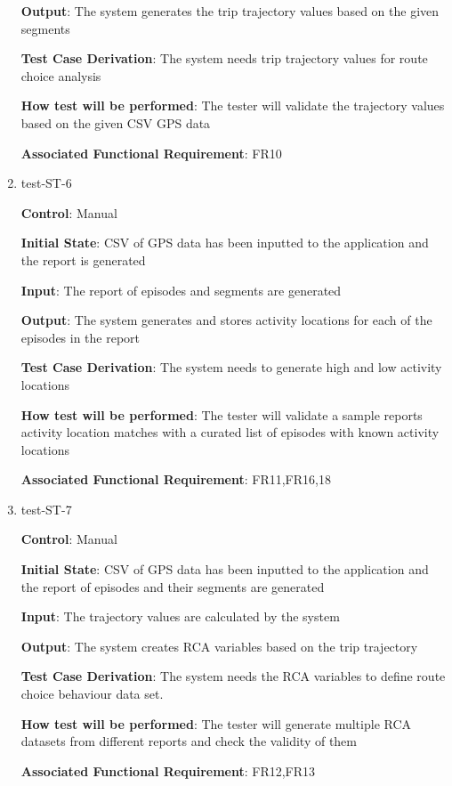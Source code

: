 \documentclass[12pt, titlepage]{article}
\begin{document}
\begin{enumerate}
\textbf{Output}: The system generates the trip trajectory values based on the given segments

\textbf{Test Case Derivation}: The system needs trip trajectory values for route choice analysis

\textbf{How test will be performed}: The tester will validate the trajectory values based on the given CSV GPS data 

\textbf{Associated Functional Requirement}: FR10

\item{test-ST-6\\}

\textbf{Control}: Manual
					
\textbf{Initial State}: CSV of GPS data has been inputted to the application and the report is generated
					
\textbf{Input}: The report of episodes and segments are generated
					
\textbf{Output}: The system generates and stores activity locations for each of the episodes in the report

\textbf{Test Case Derivation}: The system needs to generate high and low activity locations

\textbf{How test will be performed}: The tester will validate a sample reports activity location matches with a curated list of episodes with known activity locations

\textbf{Associated Functional Requirement}: FR11,FR16,18

\item{test-ST-7\\}

\textbf{Control}: Manual
					
\textbf{Initial State}: CSV of GPS data has been inputted to the application and the report of episodes and their segments are generated
					
\textbf{Input}: The trajectory values are calculated by the system
					
\textbf{Output}: The system creates RCA variables based on the trip trajectory 

\textbf{Test Case Derivation}: The system needs the RCA variables to define route choice behaviour data set. 

\textbf{How test will be performed}: The tester will generate multiple RCA datasets from different reports and check the validity of them

\textbf{Associated Functional Requirement}: FR12,FR13


\end{enumerate}
\end{document}
